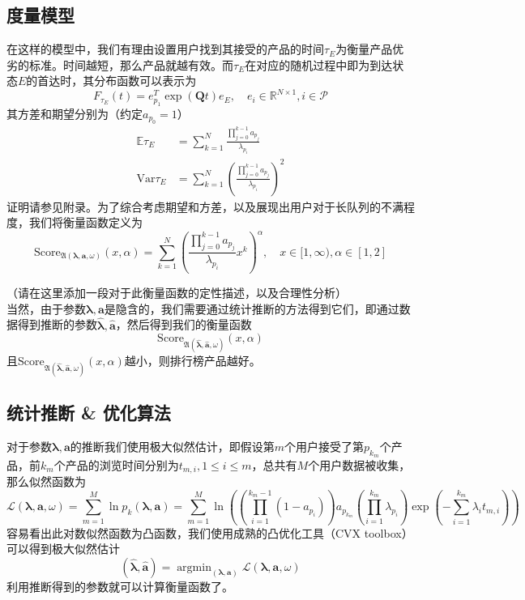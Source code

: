 \documentclass[UTF8]{ctexart}
\theoremstyle{plain}
\theoremstyle{definition}
\theoremstyle{remark}
\DeclareMathOperator*{\argmin}{argmin}
\begin{document}
	\subsection{度量模型}
	在这样的模型中，我们有理由设置用户找到其接受的产品的时间$\tau_E$为衡量产品优劣的标准。时间越短，那么产品就越有效。而$\tau_E$在对应的随机过程中即为到达状态$E$的首达时，其分布函数可以表示为
	$$
	F_{\tau_E}(t) = e_{p_1}^T \exp(\bm{Q}t)e_{E}, \quad e_i \in \mathbb{R}^{N \times 1}, i \in \mathcal{P}
	$$
	其方差和期望分别为（约定$a_{p_0} = 1$）
	\begin{equation}
	\begin{aligned}
	\mathbb{E} \tau_E & = \sum_{k=1}^N \frac{\prod\limits_{j=0}^{k-1}a_{p_j}}{\lambda_{p_i}} \\
	\mathrm{Var} \tau_E & = \sum_{k=1}^N \left(\frac{\prod\limits_{j=0}^{k-1}a_{p_j}}{\lambda_{p_i}}\right)^2
	\end{aligned}
	\end{equation}
	证明请参见附录。为了综合考虑期望和方差，以及展现出用户对于长队列的不满程度，我们将衡量函数定义为
	\begin{equation}
	\mathrm{Score}_{\mathfrak{A}\left(\bm{\lambda}, \bm{a}, \omega\right)}(x, \alpha) =  \sum_{k=1}^N \left(\frac{\prod\limits_{j=0}^{k-1}a_{p_j}}{\lambda_{p_i}} x^k\right)^\alpha, \quad x \in [1, \infty), \alpha \in [1,2]
	\end{equation}
	
	（请在这里添加一段对于此衡量函数的定性描述，以及合理性分析） \\
	
	当然，由于参数$\bm{\lambda}, \bm{a}$是隐含的，我们需要通过统计推断的方法得到它们，即通过数据得到推断的参数$\bm{\hat{\lambda}}, \bm{\hat{a}}$，然后得到我们的衡量函数
	$$
	\mathrm{Score}_{\mathfrak{A}\left(\bm{\hat{\lambda}}, \bm{\hat{a}}, \omega\right)}(x, \alpha)
	$$
	且$\mathrm{Score}_{\mathfrak{A}\left(\bm{\hat{\lambda}}, \bm{\hat{a}}, \omega\right)}(x, \alpha)$越小，则排行榜产品越好。
	\subsection{统计推断 \& 优化算法}
	对于参数$\bm{\lambda}, \bm{a}$的推断我们使用极大似然估计，即假设第$m$个用户接受了第$p_{k_m}$个产品，前$k_m$个产品的浏览时间分别为$t_{m,i}, 1 \leq i \leq m$，总共有$M$个用户数据被收集，那么似然函数为
	\begin{equation}
	\mathcal{L}\left(\bm{\lambda}, \bm{a}, \omega\right) = \sum_{m=1}^M \ln p_k(\bm{\lambda}, \bm{a}) = \sum_{m=1}^M \ln \left(\left(\prod_{i=1}^{k_m-1}(1-a_{p_i})\right)a_{p_{k_m}}\left(\prod_{i=1}^{k_m} \lambda_{p_i}\right)\exp\left(-\sum_{i=1}^{k_m}\lambda_i t_{m,i}\right)\right)
	\end{equation}
	容易看出此对数似然函数为凸函数，我们使用成熟的凸优化工具（CVX toolbox）可以得到极大似然估计
	$$
	\left(\bm{\hat{\lambda}}, \bm{\hat{a}}\right) = \argmin_{\left(\bm{\lambda}, \bm{a}\right)} \mathcal{L}\left(\bm{\lambda}, \bm{a}, \omega\right)
	$$
	利用推断得到的参数就可以计算衡量函数了。
\end{document}
